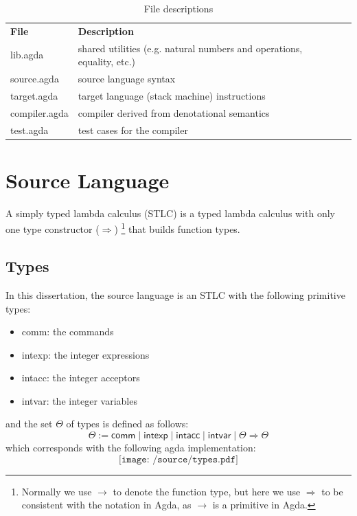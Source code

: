 \documentclass[12pt,twoside,a4paper]{report}
\theoremstyle{definition}
\theoremstyle{definition}
\theoremstyle{definition}
\theoremstyle{definition}
\begin{document}
        \begin{table}[H]
            \centering
            \begin{tabular}{|l|l|l|}
                \hline
                \textbf{File} & \textbf{Description}\\
                \hhline{|=|=|}
                lib.agda & shared utilities (e.g. natural numbers and operations, equality, etc.) \\
                \hline
                source.agda & source language syntax \\
                \hline
                target.agda & target language (stack machine) instructions \\
                \hline
                compiler.agda & compiler derived from denotational semantics \\
                \hline
                test.agda & test cases for the compiler \\
                \hline
            \end{tabular}
            \caption{File descriptions}
            \label{tab: file_descriptions}
        \end{table}

    \section{Source Language}
    A simply typed lambda calculus (STLC) is a typed lambda calculus with only one type constructor ($\Rightarrow$) \footnote{Normally we use $\to$ to denote the function type, but here we use $\Rightarrow$ to be consistent with the notation in Agda, as $\to$ is a primitive in Agda.} that builds function types. 
    
        \subsection{Types}
        In this dissertation, the source language is an STLC with the following primitive types:
        \begin{itemize}
            \item 
                \textsf{comm}: the commands
            \item 
                \textsf{intexp}: the integer expressions
            \item 
                \textsf{intacc}: the integer acceptors
            \item 
                \textsf{intvar}: the integer variables
        \end{itemize}
        and the set $\Theta$ of types is defined as follows: 
        \[ \Theta := \textsf{comm} \mid \textsf{intexp} \mid \textsf{intacc} \mid \textsf{intvar} \mid \Theta \Rightarrow \Theta \] 
        which corresponds with the following agda implementation:
        \[\texttt{[image: /source/types.pdf]}\]
\end{document}
